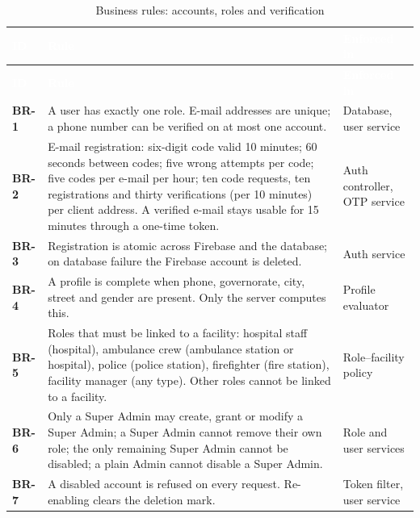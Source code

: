 {\tabfont\rowband
\begin{longtable}{@{}>{\raggedright\arraybackslash}p{}>{\raggedright\arraybackslash}p{}>{\raggedright\arraybackslash}p{}@{}}
\caption{Business rules: accounts, roles and verification}\label{tab:br-accounts}\\
\rowcolor{najdanavy}\textcolor{white}{\sffamily\bfseries\small ID} & \textcolor{white}{\sffamily\bfseries\small Rule} & \textcolor{white}{\sffamily\bfseries\small Enforced in}\\
\endfirsthead
\rowcolor{najdanavy}\textcolor{white}{\sffamily\bfseries\small ID} & \textcolor{white}{\sffamily\bfseries\small Rule} & \textcolor{white}{\sffamily\bfseries\small Enforced in}\\
\endhead
\bottomrule\endlastfoot
\textbf{BR-1} & A user has exactly one role. E-mail addresses are unique; a phone number can be verified on at most one account. & Database, user service\\
\textbf{BR-2} & E-mail registration: six-digit code valid 10 minutes; 60 seconds between codes; five wrong attempts per code; five codes per e-mail per hour; ten code requests, ten registrations and thirty verifications (per 10 minutes) per client address. A verified e-mail stays usable for 15 minutes through a one-time token. & Auth controller, OTP service\\
\textbf{BR-3} & Registration is atomic across Firebase and the database; on database failure the Firebase account is deleted. & Auth service\\
\textbf{BR-4} & A profile is complete when phone, governorate, city, street and gender are present. Only the server computes this. & Profile evaluator\\
\textbf{BR-5} & Roles that must be linked to a facility: hospital staff (hospital), ambulance crew (ambulance station or hospital), police (police station), firefighter (fire station), facility manager (any type). Other roles cannot be linked to a facility. & Role--facility policy\\
\textbf{BR-6} & Only a Super Admin may create, grant or modify a Super Admin; a Super Admin cannot remove their own role; the only remaining Super Admin cannot be disabled; a plain Admin cannot disable a Super Admin. & Role and user services\\
\textbf{BR-7} & A disabled account is refused on every request. Re-enabling clears the deletion mark. & Token filter, user service\\

\end{longtable}}
